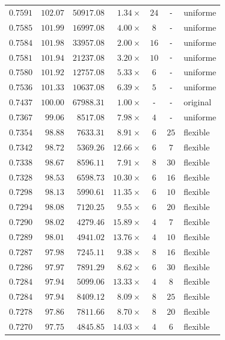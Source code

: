 {\begin{longtable}{@{}r r r r c c l@{}}
    $0.7591$ & $102.07$ & $50917.08$ & $1.34\times$ & $24$ & \texttt{-} & uniforme \\
    $0.7585$ & $101.99$ & $16997.08$ & $4.00\times$ & $8$ & \texttt{-} & uniforme \\
    $0.7584$ & $101.98$ & $33957.08$ & $2.00\times$ & $16$ & \texttt{-} & uniforme \\
    $0.7581$ & $101.94$ & $21237.08$ & $3.20\times$ & $10$ & \texttt{-} & uniforme \\
    $0.7580$ & $101.92$ & $12757.08$ & $5.33\times$ & $6$ & \texttt{-} & uniforme \\
    $0.7536$ & $101.33$ & $10637.08$ & $6.39\times$ & $5$ & \texttt{-} & uniforme \\
    \rowcolor{gray!20}
    $0.7437$ & $100.00$ & $67988.31$ & $1.00\times$ & \texttt{-} & \texttt{-} & original \\
    $0.7367$ & $99.06$ & $8517.08$ & $7.98\times$ & $4$ & \texttt{-} & uniforme \\
    $0.7354$ & $98.88$ & $7633.31$ & $8.91\times$ & $6$ & $25$ & flexible \\
    $0.7342$ & $98.72$ & $5369.26$ & $12.66\times$ & $6$ & $7$ & flexible \\
    $0.7338$ & $98.67$ & $8596.11$ & $7.91\times$ & $8$ & $30$ & flexible \\
    $0.7328$ & $98.53$ & $6598.73$ & $10.30\times$ & $6$ & $16$ & flexible \\
    $0.7298$ & $98.13$ & $5990.61$ & $11.35\times$ & $6$ & $10$ & flexible \\
    $0.7294$ & $98.08$ & $7120.25$ & $9.55\times$ & $6$ & $20$ & flexible \\
    $0.7290$ & $98.02$ & $4279.46$ & $15.89\times$ & $4$ & $7$ & flexible \\
    $0.7289$ & $98.01$ & $4941.02$ & $13.76\times$ & $4$ & $10$ & flexible \\
    $0.7287$ & $97.98$ & $7245.11$ & $9.38\times$ & $8$ & $16$ & flexible \\
    $0.7286$ & $97.97$ & $7891.29$ & $8.62\times$ & $6$ & $30$ & flexible \\
    $0.7284$ & $97.94$ & $5099.06$ & $13.33\times$ & $4$ & $8$ & flexible \\
    $0.7284$ & $97.94$ & $8409.12$ & $8.09\times$ & $8$ & $25$ & flexible \\
    $0.7278$ & $97.86$ & $7811.66$ & $8.70\times$ & $8$ & $20$ & flexible \\
    $0.7270$ & $97.75$ & $4845.85$ & $14.03\times$ & $4$ & $6$ & flexible \\

\end{longtable}}
